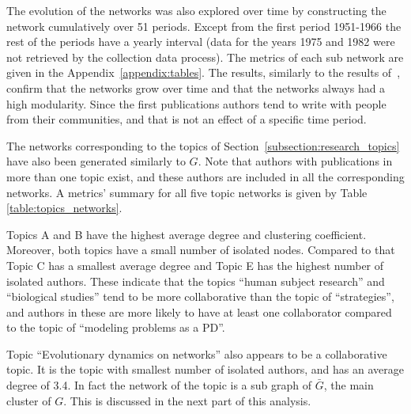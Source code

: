 \documentclass{article}
\theoremstyle{definition}
\begin{document}
The evolution of the networks was also explored over time by constructing the
network cumulatively over 51 periods. Except from the first period 1951-1966 the
rest of the periods have a yearly interval (data for the years 1975 and 1982
were not retrieved by the collection data process). The metrics of each sub
network are given in the Appendix~\ref{appendix:tables}.
The results, similarly to the results of~\citep{Liu2015}, confirm that the
networks grow over time and that the networks always had a high modularity.
Since the first publications authors tend to write with people from their
communities, and that is not an effect of a specific time period.

The networks corresponding to the topics of Section~\ref{subsection:research_topics} have
also been generated similarly to \(G\). Note that authors with publications in
more than one topic exist, and these authors are included in all the corresponding
networks. A metrics' summary for all five topic networks is given by Table
\ref{table:topics_networks}.

Topics A and B have the highest average degree and clustering coefficient.
Moreover, both topics have a small number of isolated nodes. Compared to that
Topic C has a smallest average degree and Topic E has the highest number of
isolated authors. These indicate that the topics ``human subject research'' and
``biological studies'' tend to be more collaborative than the topic of
``strategies'', and authors in these are more likely to have at least one
collaborator compared to the topic of ``modeling problems as a PD''.

Topic ``Evolutionary dynamics on networks'' also appears to be a collaborative
topic. It is the topic with smallest number of isolated authors, and has an
average degree of 3.4. In fact the network of the topic is a
sub graph of \(\bar{G}\), the main cluster of $G$. This is discussed in the next
part of this analysis.
\end{document}
